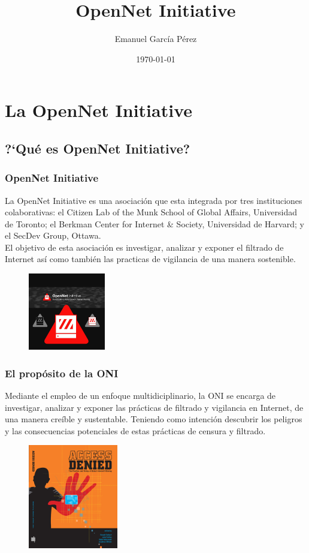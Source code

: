 \documentclass{beamer}
\title{\textbf{OpenNet Initiative}}
\author{Emanuel Garc\'ia P\'erez}
\date{\today}
\begin{document}
\frame[allowframebreaks]{\titlepage}
\section[Contenidos]{}
\frame{
\transdissolve[duration=0.2]
\tableofcontents
}


\section{La OpenNet Initiative}
\subsection{?`Qu\'e es OpenNet Initiative?}
\frame
{
\transdissolve[duration=0.2]
\frametitle{OpenNet Initiative}
La OpenNet Initiative es una asociaci\'on que esta integrada por tres instituciones colaborativas: el Citizen Lab of the Munk School of Global Affairs, Universidad de Toronto; el Berkman Center for Internet \& Society, Universidad de Harvard; y el SecDev Group, Ottawa.\\
El objetivo de esta asociaci\'on es investigar, analizar y exponer el filtrado de Internet as\'i como tambi\'en las practicas de vigilancia de una manera sostenible.
\begin{figure}
  \centering
    \includegraphics[width=0.3\textwidth]{oni.png}
  \label{fig:ejemplo}
\end{figure}
}

\frame
{
\transdissolve[duration=0.2]
\frametitle{El prop\'osito de la ONI}
Mediante el empleo de un enfoque multidiciplinario, la ONI se encarga de investigar, analizar y exponer las pr\'acticas de filtrado y vigilancia en Internet, de una manera cre\'ible y sustentable. Teniendo como intenci\'on descubrir los peligros y las consecuencias potenciales de estas pr\'acticas de censura y filtrado.
\begin{figure}
  \centering
    \includegraphics[width=0.35\textwidth]{img.jpg}
  \label{fig:ejemplo}
\end{figure}
}
\end{document}
